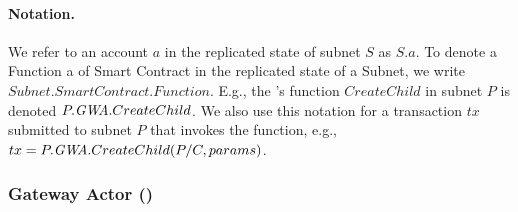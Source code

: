 \paragraph{Notation.} We refer to an account $a$ in the replicated state of subnet $S$ as $S.a$.
To denote a Function a of Smart Contract in the replicated state of a Subnet, we write $Subnet.SmartContract.Function$.
E.g., the \gw's function $CreateChild$ in subnet $P$ is denoted $P.\textit{GWA}.CreateChild$.
We also use this notation for a transaction $tx$ submitted to subnet $P$ that invokes the function, e.g., $tx = P.\textit{GWA}.CreateChild(P/C, params)$.

\subsubsection{Gateway Actor (\gw)}

